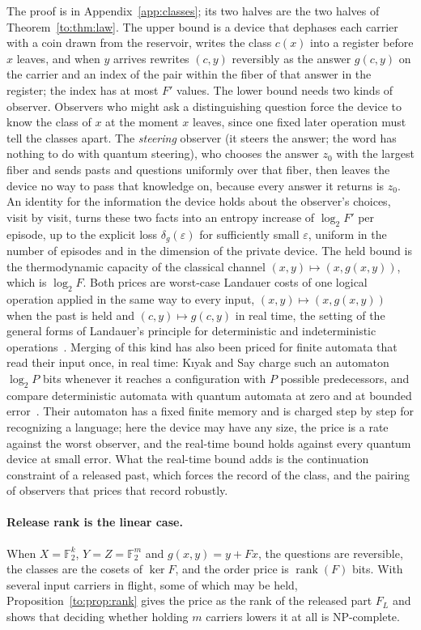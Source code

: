 The proof is in Appendix~\ref{app:classes}; its two halves are the two halves of Theorem~\ref{to:thm:law}. The upper bound is a device that dephases each carrier with a coin drawn from the reservoir, writes the class $c(x)$ into a register before $x$ leaves, and when $y$ arrives rewrites $(c,y)$ reversibly as the answer $g(c,y)$ on the carrier and an index of the pair within the fiber of that answer in the register; the index has at most $F'$ values. The lower bound needs two kinds of observer. Observers who might ask a distinguishing question force the device to know the class of $x$ at the moment $x$ leaves, since one fixed later operation must tell the classes apart. The \emph{steering} observer (it steers the answer; the word has nothing to do with quantum steering), who chooses the answer $z_0$ with the largest fiber and sends pasts and questions uniformly over that fiber, then leaves the device no way to pass that knowledge on, because every answer it returns is $z_0$. An identity for the information the device holds about the observer's choices, visit by visit, turns these two facts into an entropy increase of $\log_2F'$ per episode, up to the explicit loss $\delta_g(\varepsilon)$ for sufficiently small $\varepsilon$, uniform in the number of episodes and in the dimension of the private device. The held bound is the thermodynamic capacity of the classical channel $(x,y)\mapsto(x,g(x,y))$, which is $\log_2F$. Both prices are worst-case Landauer costs of one logical operation applied in the same way to every input, $(x,y)\mapsto(x,g(x,y))$ when the past is held and $(c,y)\mapsto g(c,y)$ in real time, the setting of the general forms of Landauer's principle for deterministic and indeterministic operations~\cite{Turgut09,Maroney09}. Merging of this kind has also been priced for finite automata that read their input once, in real time: K{\i}yak and Say charge such an automaton $\log_2P$ bits whenever it reaches a configuration with $P$ possible predecessors, and compare deterministic automata with quantum automata at zero and at bounded error~\cite{KiyakSay24}. Their automaton has a fixed finite memory and is charged step by step for recognizing a language; here the device may have any size, the price is a rate against the worst observer, and the real-time bound holds against every quantum device at small error. What the real-time bound adds is the continuation constraint of a released past, which forces the record of the class, and the pairing of observers that prices that record robustly.

\paragraph{Release rank is the linear case.} When $X=\mathbb F_2^k$, $Y=Z=\mathbb F_2^m$ and $g(x,y)=y+Fx$, the questions are reversible, the classes are the cosets of $\ker F$, and the order price is $\operatorname{rank}(F)$ bits. With several input carriers in flight, some of which may be held, Proposition~\ref{to:prop:rank} gives the price as the rank of the released part $F_L$ and shows that deciding whether holding $m$ carriers lowers it at all is NP-complete.

